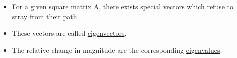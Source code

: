 \documentclass[10pt, aspectratio=169]{beamer}
\begin{document}
\begin{frame}
  \begin{columns}

    \begin{column}{0.5\textwidth}
      \centering
    \end{column}

    \begin{column}{0.5\textwidth}
      \begin{itemize}
        \item<1-> For a given square matrix A, there exists special vectors which refuse to stray from their path.
        
        \item<3->  These vectors are called \underline{eigenvectors}.
        
        \item<4-> The relative change in magnitude are the corresponding \underline{eigenvalues}.
      \end{itemize}
    \end{column}

  \end{columns}
\end{frame}
\end{document}
